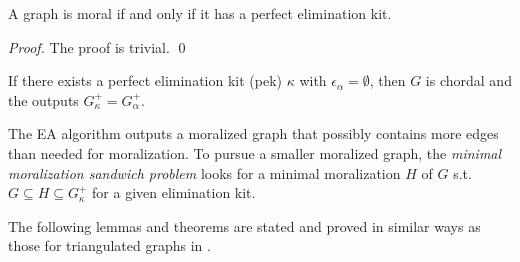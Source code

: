 \begin{theorem}
A graph is moral if and only if it has a perfect elimination kit. 
\end{theorem}
\begin{proof}
The proof is trivial. \qed
\end{proof}

If there exists a perfect elimination kit (pek) $\kappa$ with $\epsilon_{\alpha} =\emptyset$, then $G$ is chordal and the outputs $G_{\kappa}^+=G_{\alpha}^+$. 

The EA algorithm outputs a moralized graph that possibly contains more edges than needed for moralization. To pursue a smaller moralized graph, the \textit{minimal moralization sandwich problem} looks for a minimal moralization $H$ of $G$ s.t. $G \subseteq H \subseteq G_{\kappa}^+$ for a given elimination kit. 

The following lemmas and theorems are stated and proved in similar ways as those for triangulated graphs in \cite{rose1976algorithmic}. 

